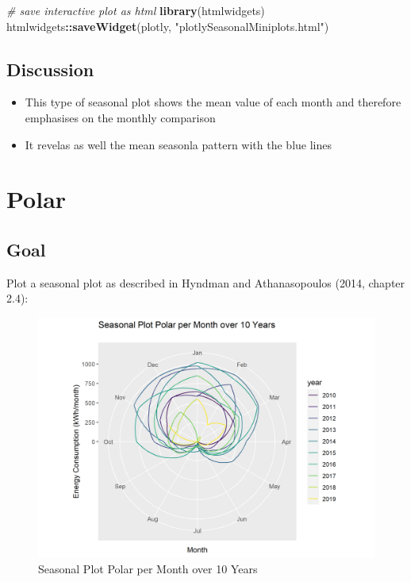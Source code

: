 \documentclass[
]{book}
\newenvironment{Shaded}{\begin{snugshade}}{\end{snugshade}}
\newcommand{\CommentTok}[1]{\textcolor[rgb]{0.56,0.35,0.01}{\textit{#1}}}
\newcommand{\KeywordTok}[1]{\textcolor[rgb]{0.13,0.29,0.53}{\textbf{#1}}}
\newcommand{\NormalTok}[1]{#1}
\newcommand{\OperatorTok}[1]{\textcolor[rgb]{0.81,0.36,0.00}{\textbf{#1}}}
\newcommand{\StringTok}[1]{\textcolor[rgb]{0.31,0.60,0.02}{#1}}
\let\oldShaded\Shaded
\let\endoldShaded\endShaded
\renewenvironment{Shaded}{\footnotesize\oldShaded}{\endoldShaded}
\begin{document}
\begin{Shaded}
\begin{Highlighting}[]
\CommentTok{# save interactive plot as html}
\KeywordTok{library}\NormalTok{(htmlwidgets)}
\NormalTok{htmlwidgets}\OperatorTok{::}\KeywordTok{saveWidget}\NormalTok{(plotly, }\StringTok{"plotlySeasonalMiniplots.html"}\NormalTok{)}
\end{Highlighting}
\end{Shaded}

\hypertarget{discussion-1}{%
\subsection{Discussion}\label{discussion-1}}

\begin{itemize}
\item
  This type of seasonal plot shows the mean value of each month and therefore emphasises on the monthly comparison
\item
  It revelas as well the mean seasonla pattern with the blue lines
\end{itemize}

\hypertarget{polar}{%
\section{Polar}\label{polar}}

\hypertarget{goal-2}{%
\subsection{Goal}\label{goal-2}}

Plot a seasonal plot as described in Hyndman and Athanasopoulos (2014, chapter 2.4):

\begin{figure}
\includegraphics[width=0.7\linewidth]{images/plotSeasonalPolar} \caption{Seasonal Plot Polar per Month over 10 Years}\label{fig:unnamed-chunk-6}
\end{figure}
\end{document}
